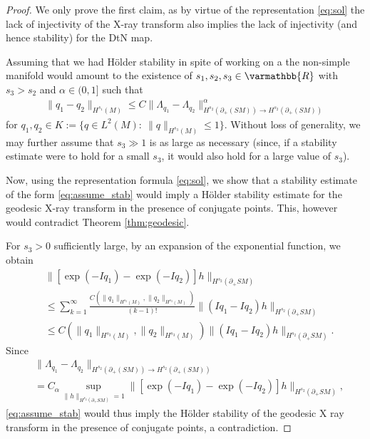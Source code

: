 \documentclass[12pt,twoside]{amsart}
\numberwithin{equation}{section}
\renewcommand{\leq}{\leqslant}
\renewcommand{\mathbb}{\varmathbb}
\newcommand {\R} {\mathbb{R}} \newcommand {\Z} {\mathbb{Z}}
\begin{document}
\begin{proof}
We only prove the first claim, as by virtue of the representation \eqref{eq:sol} the lack of injectivity of the X-ray transform also implies the lack of injectivity (and hence stability) for the DtN map.


Assuming that we had H{\"o}lder stability in spite of working on a the non-simple manifold would amount to the existence of $s_1,s_2,s_3 \in \R$ with $s_3>s_2$ and $\alpha \in (0,1]$ such that
\begin{align}
\label{eq:assume_stab}
\|q_1 -q_2\|_{H^{s_1}(M)}
\leq C \|\Lambda_{q_1}-\Lambda_{q_2}\|_{H^{s_2}(\partial_+(SM)) \rightarrow H^{s_2}(\partial_+(SM))}^{\alpha}
\end{align}
for $q_1,q_2 \in K:=\{q\in L^2(M): \ \|q\|_{H^{s_3}(M)} \leq 1 \}$. Without loss of generality, we may further assume that $s_3\gg 1$ is as large as necessary (since, if a stability estimate were to hold for a small $s_3$, it would also hold for a large value of $s_3$).

Now, using the representation formula \eqref{eq:sol}, we show that a stability estimate of the form \eqref{eq:assume_stab} would imply a H{\"o}lder stability estimate for the geodesic X-ray transform in the presence of conjugate points. This, however would contradict Theorem \ref{thm:geodesic}. 


For $s_3>0$ sufficiently large, by an expansion of the exponential function, we obtain
\begin{align*}
&\|[\exp(-Iq_1)-\exp(-I q_2)]h\|_{H^{s_2}(\partial_+ SM)}\\
&\leq \sum\limits_{k=1}^{\infty} \frac{C(\|q_1\|_{H^{s_3}(M)}, \|q_2\|_{H^{s_3}(M)})}{(k-1)!} \|(Iq_1 - I q_2) h\|_{H^{s_2}(\partial_+ SM)}\\
& \leq C(\|q_1\|_{H^{s_3}(M)}, \|q_2\|_{H^{s_3}(M)})\|(Iq_1 - I q_2) h\|_{H^{s_2}(\partial_+ SM)}.
\end{align*}
Since 
\begin{align*}
& \|\Lambda_{q_1}-\Lambda_{q_2}\|_{H^{s_2}(\partial_+(SM)) \rightarrow H^{s_2}(\partial_+(SM))}\\
& = C_{\alpha}\sup\limits_{\|h\|_{H^{s_2}(\partial_+ SM)}=1} 
 \|[\exp(-Iq_1)-\exp(-I q_2)]h\|_{H^{s_2}(\partial_+ SM)},
\end{align*}
\eqref{eq:assume_stab} would thus imply the H{\"o}lder stability of the geodesic X ray transform in the presence of conjugate points, a contradiction.
\end{proof}
\end{document}
